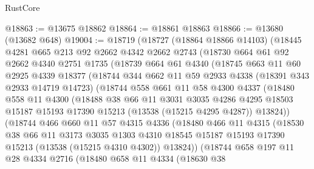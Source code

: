 \begin{lexlean}{RustCore}
\begin{coremodule}
@18863 := @13675 @18862
@18864 := @18861 @18863
@18866 := @13680 (@13682 @648)
@19004 := @18719
    (@18727
      (@18864 @18866 @14103)
      (@18445
        @4281
        @665
        @213
        @92
        @2662
        @4342
        @2662
        @2743
        (@18730
          @664
          @61
          @92
          @2662
          @4340
          @2751
          @1735
          (@18739
            @664
            @61
            @4340
            (@18745
              @663
              @11
              @60
              @2925
              @4339
              @18377
              (@18744
                @344
                @662
                @11
                @59
                @2933
                @4338
                (@18391 @343 @2933 @14719 @14723)
                (@18744
                  @558
                  @661
                  @11
                  @58
                  @4300
                  @4337
                  (@18480
                    @558
                    @11
                    @4300
                    (@18488
                      @38
                      @66
                      @11
                      @3031
                      @3035
                      @4286
                      @4295
                      @18503
                      @15187
                      @15193
                      @17390
                      @15213
                      (@13538 (@15215 @4295 @4287))
                      @13824))
                  (@18744
                    @466
                    @660
                    @11
                    @57
                    @4315
                    @4336
                    (@18480
                      @466
                      @11
                      @4315
                      (@18530
                        @38
                        @66
                        @11
                        @3173
                        @3035
                        @1303
                        @4310
                        @18545
                        @15187
                        @15193
                        @17390
                        @15213
                        (@13538 (@15215 @4310 @4302))
                        @13824))
                    (@18744
                      @658
                      @197
                      @11
                      @28
                      @4334
                      @2716
                      (@18480
                        @658
                        @11
                        @4334
                        (@18630
                          @38

\end{coremodule}
\end{lexlean}
